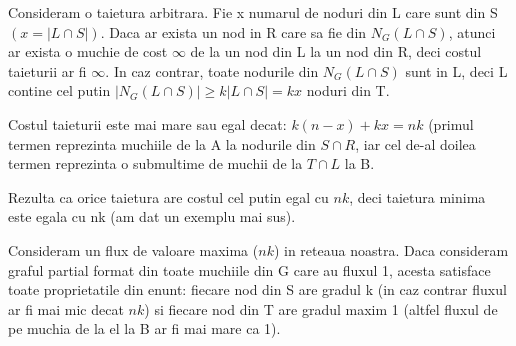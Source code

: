 \documentclass[paper=a4, fontsize=11pt]{scrartcl}
\begin{document}
Consideram o taietura arbitrara. Fie x numarul de noduri din L care sunt din S $(x=\left|L\cap S\right|)$. Daca ar exista un nod in R care sa fie din $N_G(L \cap S)$, atunci ar exista o muchie de cost $\infty$ de la un nod din L la un nod din R, deci costul taieturii ar fi $\infty$. In caz contrar, toate nodurile din $N_G(L \cap S)$ sunt in L, deci L contine cel putin $\left| N_G(L \cap S) \right| \geqslant k\left| L \cap S \right| =kx$ noduri din T.

Costul taieturii este mai mare sau egal decat: $k(n-x)+kx=nk$ (primul termen reprezinta muchiile de la A la nodurile din $S \cap R$, iar cel de-al doilea termen reprezinta o submultime de muchii de la $T \cap L$ la B.

Rezulta ca orice taietura are costul cel putin egal cu $nk$, deci taietura minima este egala cu nk (am dat un exemplu mai sus).

Consideram un flux de valoare maxima ($nk$) in reteaua noastra. Daca consideram graful partial format din toate muchiile din G care au fluxul 1, acesta satisface toate proprietatile din enunt: fiecare nod din S are gradul k (in caz contrar fluxul ar fi mai mic decat $nk$) si fiecare nod din T are gradul maxim 1 (altfel fluxul de pe muchia de la el la B ar fi mai mare ca 1).
\end{document}
